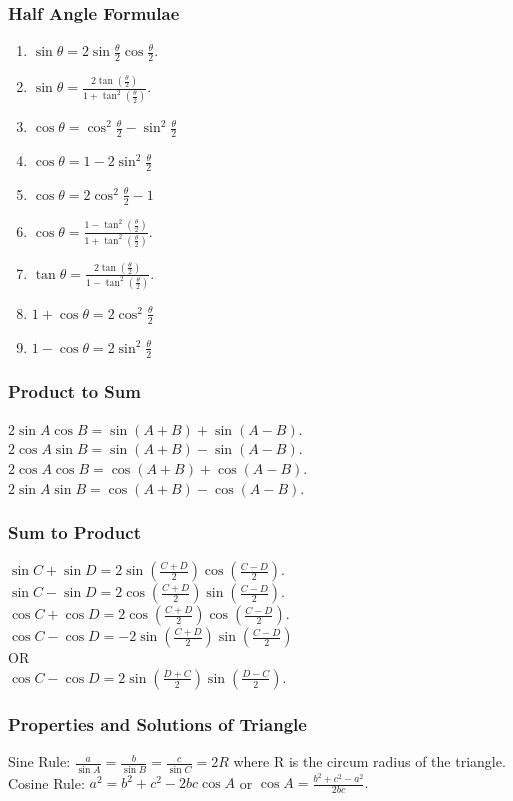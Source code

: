 \documentclass{article}
\begin{document}
\subsubsection*{Half Angle Formulae}
\begin{enumerate}
\item $\sin \theta=2\sin\frac{\theta}{2}\cos\frac{\theta}{2}.$
\item $\sin \theta=\frac{2\tan(\frac{\theta}{2})}{1+\tan^{2}(\frac{\theta}{2})}.$
\item $\cos \theta=\cos^{2}\frac{\theta}{2}-\sin^{2}\frac{\theta}{2}$
\item $\cos \theta=1-2\sin^{2}\frac{\theta}{2}$
\item $\cos \theta=2\cos^{2}\frac{\theta}{2}-1$
\item $\cos \theta=\frac{1-\tan^{2}(\frac{\theta}{2})}{1+\tan^{2}(\frac{\theta}{2})}.$
\item $\tan \theta=\frac{2\tan(\frac{\theta}{2})}{1-\tan^{2}(\frac{\theta}{2})}.$
\item $1+\cos \theta=2\cos^{2}\frac{\theta}{2}$
\item $1-\cos \theta=2\sin^{2}\frac{\theta}{2}$
\end{enumerate}

\subsubsection*{Product to Sum}
$2\sin A\cos B=\sin(A+B)+\sin(A-B).$\\
$2\cos A\sin B=\sin(A+B)-\sin(A-B).$\\
$2\cos A\cos B=\cos(A+B)+\cos(A-B).$\\
$2\sin A\sin B=\cos(A+B)-\cos(A-B).$

\subsubsection*{Sum to Product}
$\sin C+\sin D=2\sin(\frac{C+D}{2})\cos(\frac{C-D}{2}).$\\
$\sin C-\sin D=2\cos(\frac{C+D}{2})\sin(\frac{C-D}{2}).$\\
$\cos C+\cos D=2\cos(\frac{C+D}{2})\cos(\frac{C-D}{2}).$\\
$\cos C-\cos D=-2\sin(\frac{C+D}{2})\sin(\frac{C-D}{2})$\\
OR\\
$\cos C-\cos D=2\sin(\frac{D+C}{2})\sin(\frac{D-C}{2}).$

\subsubsection*{Properties and Solutions of Triangle}
Sine Rule: $\frac{a}{\sin A}=\frac{b}{\sin B}=\frac{c}{\sin C}=2R$ where R is the circum radius of the triangle.
\\Cosine Rule:
$a^{2}=b^{2}+c^{2}-2bc \cos A$ or $\cos A=\frac{b^{2}+c^{2}-a^{2}}{2bc}.$
\end{document}

